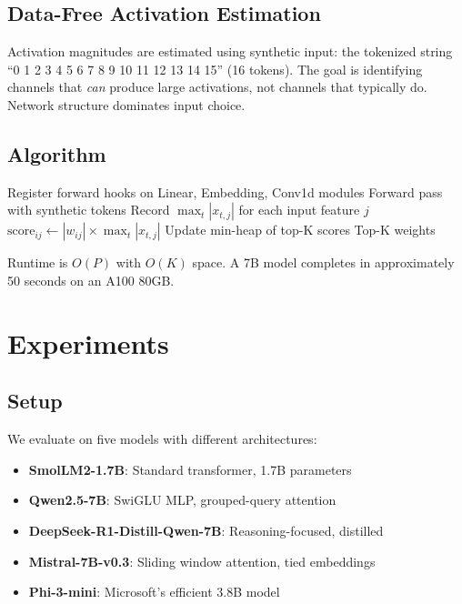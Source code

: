 \documentclass{article}
\begin{document}
\subsection{Data-Free Activation Estimation}

Activation magnitudes are estimated using synthetic input: the tokenized string ``0 1 2 3 4 5 6 7 8 9 10 11 12 13 14 15'' (16 tokens). The goal is identifying channels that \textit{can} produce large activations, not channels that typically do. Network structure dominates input choice.

\subsection{Algorithm}

\begin{algorithm}[H]
\caption{PeakWeights}
\begin{algorithmic}[1]
\STATE Register forward hooks on Linear, Embedding, Conv1d modules
\STATE Forward pass with synthetic tokens
    \STATE Record $\max_t |x_{t,j}|$ for each input feature $j$
\ENDFOR
{}
    \STATE $\text{score}_{ij} \leftarrow |w_{ij}| \times \max_t |x_{t,j}|$
    \STATE Update min-heap of top-K scores
\ENDFOR
\RETURN Top-K weights
\end{algorithmic}
\end{algorithm}

Runtime is $O(P)$ with $O(K)$ space. A 7B model completes in approximately 50 seconds on an A100 80GB.

\section{Experiments}

\subsection{Setup}

We evaluate on five models with different architectures:
\begin{itemize}
    \item \textbf{SmolLM2-1.7B}: Standard transformer, 1.7B parameters
    \item \textbf{Qwen2.5-7B}: SwiGLU MLP, grouped-query attention
    \item \textbf{DeepSeek-R1-Distill-Qwen-7B}: Reasoning-focused, distilled
    \item \textbf{Mistral-7B-v0.3}: Sliding window attention, tied embeddings
    \item \textbf{Phi-3-mini}: Microsoft's efficient 3.8B model
\end{itemize}
\end{document}
